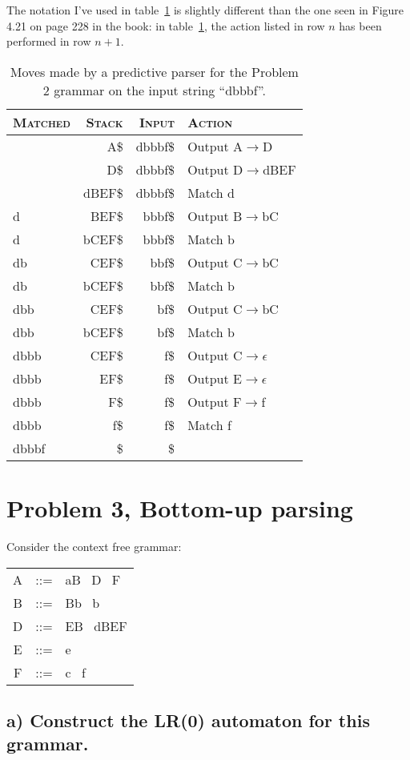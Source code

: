 The notation I've used in table~\ref{tab:2c} is slightly different than the one seen in Figure 4.21 on page 228 in the book:
in table~\ref{tab:2c}, the action listed in row $n$ has been performed in row $n+1$.


\begin{table}[H]
\begin{center}
\begin{tabular}{lrrl}
	\hline \hline
	\textsc{Matched} & \textsc{Stack} 	& \textsc{Input}	& \textsc{Action}	\\ \hline
					 & A\$				& dbbbf\$			& Output A$\rightarrow$D		\\
					 & D\$				& dbbbf\$			& Output D$\rightarrow$dBEF	\\
					 & dBEF\$			& dbbbf\$			& Match d		  	\\ 
	d				 & BEF\$			& bbbf\$			& Output B$\rightarrow$bC		\\
	d				 & bCEF\$			& bbbf\$			& Match b			\\
	db				 & CEF\$			& bbf\$				& Output C$\rightarrow$bC		\\
	db				 & bCEF\$			& bbf\$				& Match b			\\
	dbb				 & CEF\$			& bf\$				& Output C$\rightarrow$bC		\\
	dbb				 & bCEF\$			& bf\$				& Match b			\\
	dbbb			 & CEF\$			& f\$				& Output C$\rightarrow\epsilon$		\\
	dbbb			 & EF\$				& f\$				& Output E$\rightarrow\epsilon$		\\
	dbbb			 & F\$				& f\$				& Output F$\rightarrow$f		\\
	dbbb			 & f\$				& f\$				& Match f			\\
	dbbbf			 & \$				& \$				& 					\\ \hline					
\end{tabular}
\caption{Moves made by a predictive parser for the Problem 2 grammar on the input string ``dbbbf''.}
\label{tab:2c}
\end{center}
\end{table}

\section{Problem 3, Bottom-up parsing}
Consider the context free grammar:

\begin{table}[H]
\begin{tabular}{ccl}
	A	& ::=	& aB \textbar ~D \textbar ~F \\
	B 	& ::=	& Bb \textbar ~b \\
	D  	& ::=	& EB \textbar ~dBEF \\
	E 	& ::=	& e \\
	F 	& ::=	& c \textbar ~f \\
\end{tabular}
\end{table}

\subsection{a) Construct the LR(0) automaton for this grammar.}


